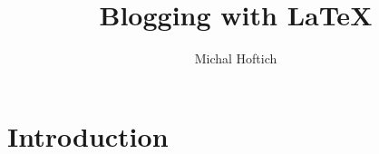 \documentclass[../index2018.tex]{subfiles}
\title{Blogging with \LaTeX}
\author{Michal Hoftich}
\begin{document}
\maketitle

\tableofcontents

\section{Introduction}

\printbibliography
\end{document}
